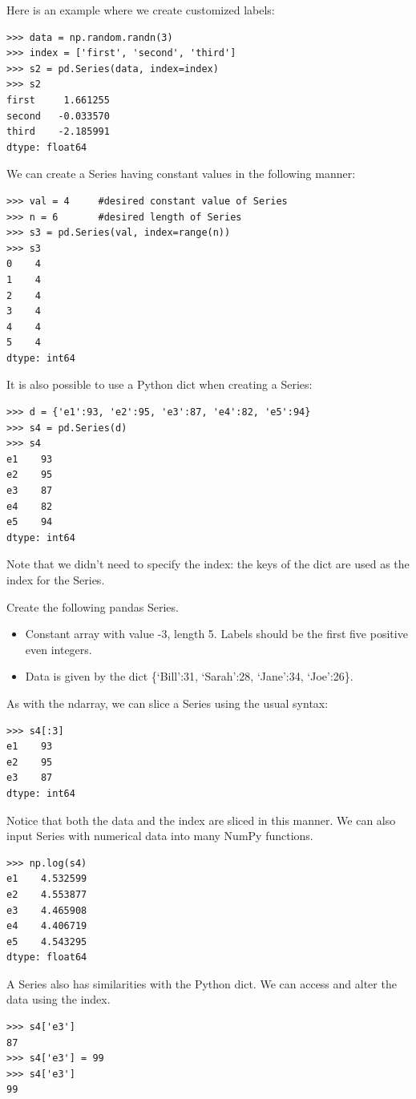 Here is an example where we create customized labels:
\begin{lstlisting}
>>> data = np.random.randn(3)
>>> index = ['first', 'second', 'third']
>>> s2 = pd.Series(data, index=index)
>>> s2
first     1.661255
second   -0.033570
third    -2.185991
dtype: float64
\end{lstlisting}

We can create a Series having constant values in the following manner:
\begin{lstlisting}
>>> val = 4     #desired constant value of Series
>>> n = 6       #desired length of Series
>>> s3 = pd.Series(val, index=range(n))
>>> s3
0    4
1    4
2    4
3    4
4    4
5    4
dtype: int64
\end{lstlisting}

It is also possible to use a Python dict when creating a Series:
\begin{lstlisting}
>>> d = {'e1':93, 'e2':95, 'e3':87, 'e4':82, 'e5':94}
>>> s4 = pd.Series(d)
>>> s4
e1    93
e2    95
e3    87
e4    82
e5    94
dtype: int64
\end{lstlisting}
Note that we didn't need to specify the index: the keys of the dict are used as the index for the Series.

\begin{problem}
Create the following pandas Series.

\begin{itemize}
\item Constant array with value -3, length 5. Labels should be the first five positive even integers.

\item Data is given by the dict \{`Bill':31, `Sarah':28, `Jane':34, `Joe':26\}.
\end{itemize}
\end{problem}

As with the ndarray, we can slice a Series using the usual syntax:
\begin{lstlisting}
>>> s4[:3]
e1    93
e2    95
e3    87
dtype: int64
\end{lstlisting}
Notice that both the data and the index are sliced in this manner.
We can also input Series with numerical data into many NumPy functions.
\begin{lstlisting}
>>> np.log(s4)
e1    4.532599
e2    4.553877
e3    4.465908
e4    4.406719
e5    4.543295
dtype: float64
\end{lstlisting}

A Series also has similarities with the Python dict.
We can access and alter the data using the index.
\begin{lstlisting}
>>> s4['e3']
87
>>> s4['e3'] = 99
>>> s4['e3']
99
\end{lstlisting}

